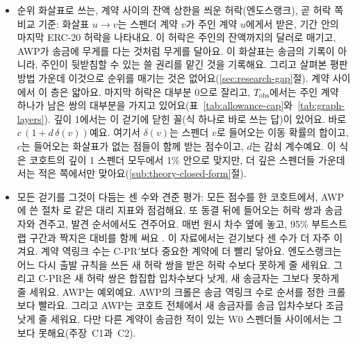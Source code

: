 \begin{itemize}
\item 순위 화살표로 쓰는, 계약 사이의 잔액 상한을 씌운 허락(엔도스랭크), 곧 허락 쪽 비교 기준: 화살표 $u \to v$는 스펜더 계약 $v$가 주인 계약 $u$에게서 받은, 기간 안의 마지막 ERC-20 허락을 나타내요. 이 허락은 주인의 잔액까지의 달러로 매기고, AWP가 송금에 무게를 다는 것처럼 무게를 달아요. 이 화살표는 송금의 기록이 아니라, 주인이 뒷받침할 수 있는 쓸 권리를 맡긴 것을 기록해요. 그리고 살펴본 평판 방법 가운데 이것으로 순위를 매기는 것은 없어요(\ref{sec:research-gap}절). 계약 사이에서 이 층은 얇아요. 마지막 허락은 대부분 0으로 잘리고, $T_{\mathrm{obs}}$에서는 주인 계약 하나가 남은 쌍의 대부분을 가지고 있어요(표~\ref{tab:allowance-cap}와~\ref{tab:graph-layers}). 깊이 1에서는 이 걷기에 닫힌 꼴(식 하나로 바로 쓰는 답)이 있어요. 바로 $c\,(1+d\,\delta(v))$예요. 여기서 $\delta(v)$는 스펜더 $v$로 들어오는 이동 확률의 합이고, $c$는 들어오는 화살표가 없는 점들이 함께 받는 점수이고, $d$는 감쇠 계수예요. 이 식은 코호트의 깊이 1 스펜더 모두에서 1\% 안으로 맞지만, 더 깊은 스펜더들 가운데서는 적은 쪽에서만 맞아요(\ref{sub:theory-closed-form}절).
\item 모든 걷기를 그것이 다듬는 센 수와 견준 평가: 모든 점수를 한 코호트에서, AWP에 쓴 절차 \parencite{do2023awp}로 같은 대리 지표와 점검해요. 또 동결 뒤에 들어오는 허락 쌍과 송금자와 견주고, 발견 순서에서도 견주어요. 매번 원시 차수 옆에 놓고, 95\% 부트스트랩 구간과 짝지은 대비를 함께 써요 \parencite{efron1979bootstrap}. 이 자료에서는 걷기보다 센 수가 더 자주 이겨요. 계약 역링크 수는 \mbox{C-PR}$'$보다 중요한 계약에 더 빨리 닿아요. 엔도스랭크는 어느 다시 출발 규칙을 쓰든 새 허락 쌍을 받은 허락 수보다 못하게 줄 세워요. 그리고 \mbox{C-PR}은 새 허락 쌍은 합집합 입차수보다 낫게, 새 송금자는 그보다 못하게 줄 세워요. AWP는 예외예요. AWP의 크롤은 송금 역링크 수로 순서를 정한 크롤보다 빨라요. 그리고 AWP는 코호트 전체에서 새 송금자를 송금 입차수보다 조금 낫게 줄 세워요. 다만 다른 계약이 송금한 적이 있는 W0 스펜더들 사이에서는 그보다 못해요(주장~C1과~C2).
\end{itemize}


